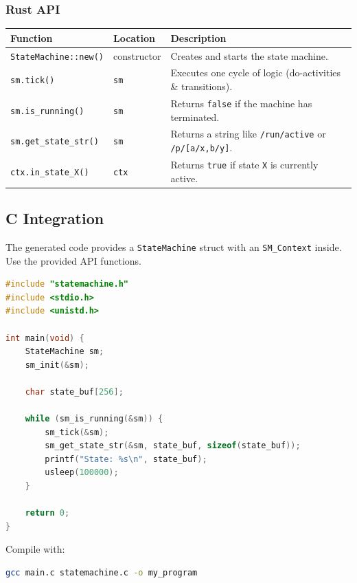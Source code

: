 \documentclass[a4paper,11pt]{article}
\begin{document}
\subsubsection*{Rust API}
\begin{longtable}{@{}llp{8cm}@{}}
\toprule
\textbf{Function} & \textbf{Location} & \textbf{Description} \\
\midrule
\endhead
\texttt{StateMachine::new()} & constructor & Creates and starts the state machine. \\
\texttt{sm.tick()} & \texttt{sm} & Executes one cycle of logic (do-activities \& transitions). \\
\texttt{sm.is\_running()} & \texttt{sm} & Returns \texttt{false} if the machine has terminated. \\
\texttt{sm.get\_state\_str()} & \texttt{sm} & Returns a string like \texttt{/run/active} or \texttt{/p/[a/x,b/y]}. \\
\texttt{ctx.in\_state\_X()} & \texttt{ctx} & Returns \texttt{true} if state \texttt{X} is currently active. \\
\bottomrule
\end{longtable}

\subsection{C Integration}
The generated code provides a \texttt{StateMachine} struct with an \texttt{SM\_Context} inside. Use the provided API functions.

\begin{lstlisting}[language=C, caption={Example C driver (main.c)}]
#include "statemachine.h"
#include <stdio.h>
#include <unistd.h>

int main(void) {
    StateMachine sm;
    sm_init(&sm);

    char state_buf[256];

    while (sm_is_running(&sm)) {
        sm_tick(&sm);
        sm_get_state_str(&sm, state_buf, sizeof(state_buf));
        printf("State: %s\n", state_buf);
        usleep(100000);
    }

    return 0;
}
\end{lstlisting}

Compile with:
\begin{lstlisting}[language=Bash]
gcc main.c statemachine.c -o my_program
\end{lstlisting}
\end{document}
